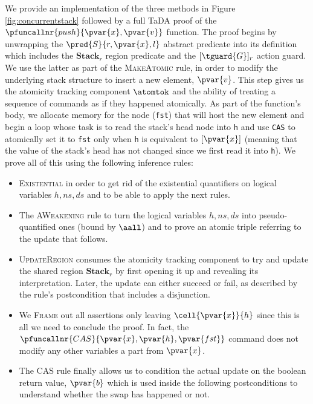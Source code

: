 We provide an implementation of the three methods in Figure \ref{fig:concurrentstack} followed by a full TaDA proof of the $\pfuncallnr{push}{\pvar{x}, \pvar{v}}$ function. The proof begins by unwrapping the $\pred{S}{r, \pvar{x}, l}$ abstract predicate into its definition which includes the $\textbf{Stack}_r$ region predicate and the $[\tguard{G}]_r$  action guard. We use the latter as part of the \textsc{MakeAtomic} rule, in order to modify the underlying stack structure to insert a new element, $\pvar{v}$. This step gives us the atomicity tracking component $\atomtok$ and the ability of treating a sequence of commands as if they happened atomically. As part of the function's body, we allocate memory for the node (\texttt{fst}) that will host the new element and begin a loop whose task is to read the stack's head node into \texttt{h} and use \texttt{CAS} to atomically set it to \texttt{fst} only when \texttt{h} is equivalent to $[\pvar{x}]$ (meaning that the value of the stack's head has not changed since we first read it into \texttt{h}). We prove all of this using the following inference rules:
\begin{itemize}
\item \textsc{Existential} in order to get rid of the existential quantifiers on logical variables $h, ns, ds$ and to be able to apply the next rules.
\item The \textsc{AWeakening} rule to turn the logical variables $h, ns, ds$ into pseudo-quantified ones (bound by $\aall$) and to prove an atomic triple referring to the update that follows.
\item \textsc{UpdateRegion} consumes the atomicity tracking component to try and update the shared region $\textbf{Stack}_r$ by first opening it up and revealing its interpretation. Later, the update can either succeed or fail, as described by the rule's postcondition that includes a disjunction.
\item We \textsc{Frame} out all assertions only leaving $\cell{\pvar{x}}{h}$ since this is all we need to conclude the proof. In fact, the $\pfuncallnr{CAS}{\pvar{x}, \pvar{h}, \pvar{fst}}$ command does not modify any other variables a part from $\pvar{x}$.
\item The \textsc{CAS} rule finally allows us to condition the actual update on the boolean return value, $\pvar{b}$ which is used inside the following postconditions to understand whether the swap has happened or not.
\end{itemize}

